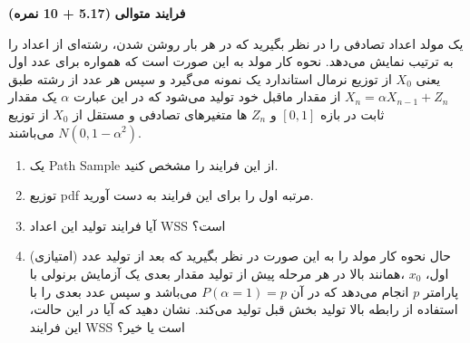 \Large \textbf{فرایند متوالی}
\large \textbf{(5.17 + 10 نمره)}

\normalsize \vspace{0.5cm}

یک مولد اعداد تصادفی را در نظر بگیرید که در هر بار روشن شدن، رشته‌ای از اعداد را به ترتیب نمایش می‌دهد. نحوه کار مولد به این صورت است که همواره برای عدد اول یعنی
${X_0}$
از توزیع نرمال استاندارد یک نمونه می‌گیرد و سپس هر عدد از رشته طبق 
${X_n} = \alpha {X_{n - 1}} + {Z_n}$
از مقدار ماقبل خود تولید می‌شود که در این عبارت
$\alpha$
یک مقدار ثابت در بازه
$\left[ {0,1} \right]$
و
${Z_n}$
ها متغیرهای تصادفی
و مستقل از
${X_0}$
از توزیع
$N\left( {0,1 - {\alpha ^2}} \right)$
می‌باشند.

\begin{enumerate}[label=(\alph*)]
	\item
	یک Path Sample از این فرایند را مشخص کنید.
	\item
	توزیع pdf مرتبه اول را برای این فرایند به دست آورید.
	\item
	آیا فرایند تولید این اعداد WSS است؟
	\item
	(امتیازی) حال نحوه کار مولد را به این صورت در نظر بگیرید که بعد از تولید عدد اول،
	${x_0}$
	،همانند بالا در هر مرحله پیش از تولید مقدار بعدی یک آزمایش برنولی با پارامتر
	$p$
	انجام می‌دهد که در آن
	$P\left( {\alpha  = 1} \right) = p$
	می‌باشد و سپس عدد بعدی را با استفاده از رابطه بالا تولید بخش قبل تولید می‌کند. نشان دهید که آیا در این حالت، این فرایند WSS است یا خیر؟
	
\end{enumerate}
